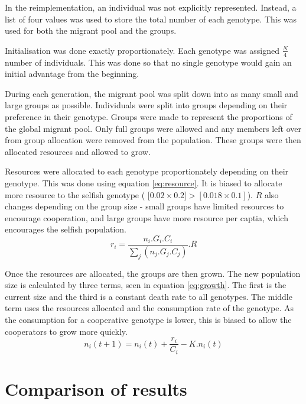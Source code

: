 \documentclass[11pt]{ecsarticle}
\begin{document}
In the reimplementation, an individual was not explicitly represented. 
Instead, a list of four values was used to store the total number of each genotype. 
This was used for both the migrant pool and the groups. 

Initialisation was done exactly proportionately. 
Each genotype was assigned $\tfrac{N}{4}$ number of individuals.
This was done so that no single genotype would gain an initial advantage from the beginning.

During each generation, the migrant pool was split down into as many small and large groups as possible.
Individuals were split into groups depending on their preference in their genotype.
Groups were made to represent the proportions of the global migrant pool. 
Only full groups were allowed and any members left over from group allocation were removed from the population. 
These groups were then allocated resources and allowed to grow. 

Resources were allocated to each genotype proportionately depending on their genotype.
This was done using equation \eqref{eq:resource}. 
It is biased to allocate more resource to the selfish genotype ( [$0.02 \times 0.2] > [0.018 \times 0.1]$). 
$R$ also changes depending on the group size - small groups have limited resources to encourage cooperation, and large groups have more resource per captia, which encourages the selfish population.
\begin{equation}
 r_i = \frac{ n_i . G_i . C_i }{\sum\limits_j (n_j . G_j . C_j )} . R 
 \label{eq:resource}
\end{equation}

Once the resources are allocated, the groups are then grown. 
The new population size is calculated by three terms, seen in equation \ref{eq:growth}. 
The first is the current size and the third is a constant death rate to all genotypes.
The middle term uses the resources allocated and the consumption rate of the genotype.
As the consumption for a cooperative genotype is lower, this is biased to allow the cooperators to grow more quickly.
\begin{equation}
 n_i (t + 1) = n_i (t) + \frac{r_i}{C_i} - K.n_i (t)
 \label{eq:growth}
\end{equation}



\section{Comparison of results}\label{sc:reimp:results}
\end{document}
